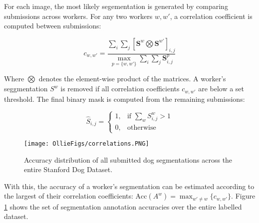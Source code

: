 

For each image, the most likely segementation is generated by comparing submissions across workers. For any two workers $w, w'$, a correlation coefficient is computed between submissions:

\begin{equation}
c_{w,w'} = \frac{\sum_i\sum_j \left[ \mathbf{S}^{w} \bigotimes \mathbf{S}^{w'} \right]_{i,j}}{\max\limits_{p = \{w,w'\}} \sum_{i} \sum_{j} \mathbf{S}^p_{i,j}}
\end{equation}


Where $\bigotimes$ denotes the element-wise product of the matrices. A worker's seggmentation $S^{w}$ is removed if all correlation coefficients $c_{w,w'}$ are below a set threshold. The final binary mask is computed from the remaining submissions:

\begin{equation}
\hat{S}_{i,j} = \begin{cases}
    1, & \text{if } \sum_w S^{w}_{i,j} > 1 \\
    0,              & \text{otherwise}
\end{cases}
\end{equation}

\begin{figure}
\centering
\texttt{[image: OllieFigs/correlations.PNG]}
\caption{Accuracy distribution of all submitted dog segmentations across the entire Stanford Dog Dataset.}
\label{fig:accuracy distribution}
\end{figure}

With this, the accuracy of a worker's segmentation can be estimated according to the largest of their correlation coefficients: $\textrm{Acc}(A^{w})=\max_{w'\neq w} \{c_{w,w'}\}$. Figure \ref{fig:accuracy distribution} shows the set of segmentation annotation accuracies over the entire labelled dataset.

